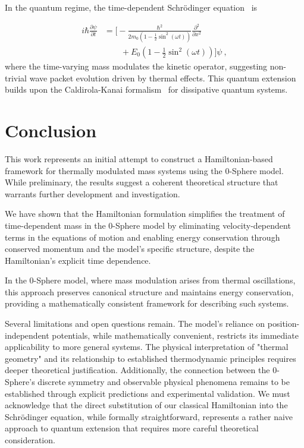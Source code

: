 \documentclass[%
 reprint,
 amsmath,amssymb,
 aps,
]{revtex4-1}
\numberwithin{equation}{section}%
\begin{document}
In the quantum regime, the time-dependent Schrödinger equation~\cite{messiah1966} is

\begin{equation}
\begin{split}
i \hbar \frac{\partial \psi}{\partial t}
    &= \Bigg[ - \frac{\hbar^2}{2 m_0 \left( 1 - \frac{1}{2} \sin^2 (\omega t) \right)} \frac{\partial^2}{\partial x^2} \\
    &\quad \quad + E_0 \left( 1 - \frac{1}{2} \sin^2 (\omega t) \right) \Bigg] \psi
    \ ,
\end{split}
\end{equation}
where the time-varying mass modulates the kinetic operator, suggesting non-trivial wave packet evolution driven by thermal effects. This quantum extension builds upon the Caldirola-Kanai formalism~\cite{caldirola1941,kanai1948} for dissipative quantum systems.


\section{Conclusion}

This work represents an initial attempt to construct a Hamiltonian-based framework for thermally modulated mass systems using the 0-Sphere model. While preliminary, the results suggest a coherent theoretical structure that warrants further development and investigation.

We have shown that the Hamiltonian formulation simplifies the treatment of time-dependent mass in the 0-Sphere model by eliminating velocity-dependent terms in the equations of motion and enabling energy conservation through conserved momentum and the model’s specific structure, despite the Hamiltonian’s explicit time dependence.

In the 0-Sphere model, where mass modulation arises from thermal oscillations, this approach preserves canonical structure and maintains energy conservation, providing a mathematically consistent framework for describing such systems.

Several limitations and open questions remain. The model's reliance on position-independent potentials, while mathematically convenient, restricts its immediate applicability to more general systems. The physical interpretation of "thermal geometry" and its relationship to established thermodynamic principles requires deeper theoretical justification. Additionally, the connection between the 0-Sphere's discrete symmetry and observable physical phenomena remains to be established through explicit predictions and experimental validation. We must acknowledge that the direct substitution of our classical Hamiltonian into the Schrödinger equation, while formally straightforward, represents a rather naive approach to quantum extension that requires more careful theoretical consideration.
\end{document}
